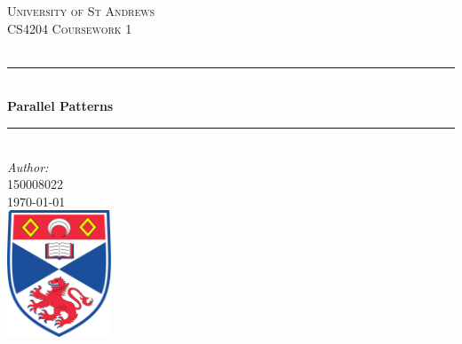 \documentclass[12pt]{article}
\begin{document}
\begin{titlepage}

\newcommand{\HRule}{\rule{\linewidth}{0.5mm}} %

\center %
 

\textsc{\LARGE University of St Andrews}\\[1.5cm] %
\textsc{\Large CS4204 Coursework 1}\\[0.5cm] %
\textsc{\large }\\[0.5cm] %


\HRule \\[0.4cm]
{ \huge \bfseries Parallel Patterns}\\[0.4cm] %
\HRule \\[1.5cm]
 


\Large \emph{Author:}\\
 \textsc{150008022}\\[3cm] %


{\large \today}\\[2cm] %


\includegraphics[width = 3.1cm]{images/standrewslogo.png}
 

\vfill %

\end{titlepage}
\end{document}
